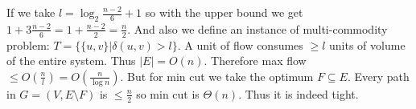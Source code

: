 If we take $l = \log_{2} \frac{n-2}{6} + 1$ so with the upper bound we get $1 + 3\frac{n-2}{6} = 1 + \frac{n-2}{2} = \frac{n}{2}$. And also we define an instance of multi-commodity problem: $T = \{\{u,v\} | \delta(u,v) > l\}$. A unit of flow consumes $\geq l$ units of volume of the entire system. Thus $|E| = O(n)$. Therefore max flow $\leq O(\frac{n}{l}) = O(\frac{n}{\log n})$. But for min cut we take the optimum $F \subseteq E$. Every path in $G = (V, E \setminus F)$ is $\leq \frac{n}{2}$ so min cut is $\Theta(n)$. Thus it is indeed tight.